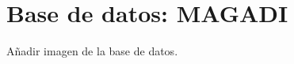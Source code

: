 \pagestyle{fancy}

\chapter{Base de datos: MAGADI}
\label{anexo-c}

Añadir imagen de la base de datos.\\